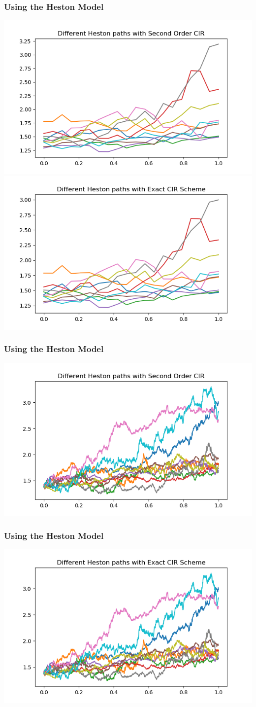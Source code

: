 \documentclass[12pt]{beamer}
\begin{document}
\begin{frame}
\frametitle{Using the Heston Model}
\includegraphics[width=.5\textwidth]{heston_cir220.png}
\includegraphics[width=.5\textwidth]{heston_exact20.png}
\end{frame}

\begin{frame}
\frametitle{Using the Heston Model}
\includegraphics[width=\textwidth]{heston_cir21000.png}
\end{frame}

\begin{frame}
\frametitle{Using the Heston Model}
\includegraphics[width=\textwidth]{heston_exact1000.png}
\end{frame}
\end{document}
